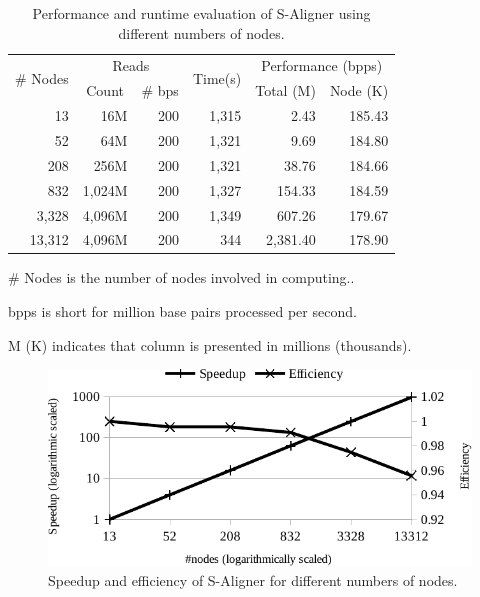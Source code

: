 \begin{table}[!htb]
  \begin{threeparttable}
    \caption{Performance and runtime evaluation of S-Aligner using
      different numbers of nodes.}
    \label{paraexp}
    \begin{tabular}{rrrrrr}
      \hline
      \multicolumn{1}{c}{\multirow{2}{*}{\# Nodes}} &
      \multicolumn{2}{c}{Reads}  &
      \multicolumn{1}{c}{\multirow{2}{*}{Time(s)}} &
      \multicolumn{2}{c}{Performance (bpps)} \\
      \cline{2-3}
      \cline{5-6}
      \multicolumn{1}{c}{} &
      \multicolumn{1}{c}{Count} &
      \multicolumn{1}{c}{\# bps} & &
      \multicolumn{1}{c}{Total (M)} &
      \multicolumn{1}{c}{Node (K)}\\
      \hline
      13 & 16M & 200 & 1,315 & 2.43 & 185.43\\
      52 & 64M & 200 & 1,321 & 9.69 & 184.80\\
      208 & 256M & 200 & 1,321 & 38.76 & 184.66\\
      832 & 1,024M & 200 & 1,327 & 154.33 & 184.59\\
      3,328 & 4,096M & 200 & 1,349 & 607.26 & 179.67\\
      13,312 & 4,096M & 200 & 344 & 2,381.40 & 178.90\\
      \hline
    \end{tabular}
    \begin{tablenotes}
    \item
      \# Nodes is the number of nodes involved in computing..
    \item
      bpps is short for million base pairs processed per second.
    \item
      M (K) indicates that column is presented in millions (thousands).
    \end{tablenotes}
  \end{threeparttable}
\end{table}

\begin{figure}[!htb]
  \begin{center}
    \includegraphics[width=1\linewidth]{figures/VarProcCha}
    \caption{Speedup and efficiency of S-Aligner for different numbers
      of nodes.}
    \label{VarProcCha}
  \end{center}
\end{figure}

